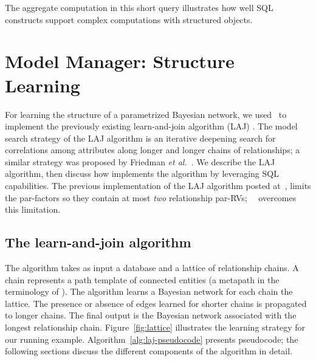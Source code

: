 The aggregate computation in this short query illustrates how well SQL constructs support complex computations with structured objects. 

%



\section{Model Manager: Structure Learning}
\label{sec:laj}
For learning the structure of a parametrized Bayesian network, we used \FB\ to implement the previously existing learn-and-join algorithm (LAJ) \cite{Khosravi2010,Schulte2012}. 
The model search strategy of the LAJ algorithm is an iterative deepening search for correlations among attributes along longer and longer chains of relationships; a similar strategy was proposed by Friedman {\em et al.}~\cite{friedman99prm}.
We describe the LAJ algorithm, then discuss how \FB implements the algorithm by leveraging SQL capabilities. The previous implementation of the LAJ algorithm posted at~\cite{bib:bbsite}, limits the par-factors so they contain at most {\em two} relationship par-RVs; ~\FB\ overcomes this limitation.

\subsection{The learn-and-join algorithm}
The algorithm takes as input a database and a lattice of relationship chains. A chain represents a path template of connected entities (a metapath in the terminology of \cite{Sun2012}). The algorithm learns a Bayesian network for each chain the lattice. The presence or absence of edges learned for shorter chains is propagated to longer chains. The final output is the Bayesian network associated with the longest relationship chain. Figure~\ref{fig:lattice} illustrates the learning strategy for our running example. Algorithm~\ref{alg:laj-pseudocode} presents pseudocode; the following sections discuss the different components of the algorithm in detail.


